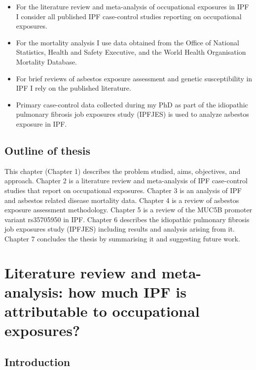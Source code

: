 \documentclass[
]{article}
\providecommand{\tightlist}{%
  \setlength{\itemsep}{0pt}\setlength{\parskip}{0pt}}
\begin{document}
\begin{itemize}
\tightlist
\item
  For the literature review and meta-analysis of occupational exposures
  in IPF I consider all published IPF case-control studies reporting on
  occupational exposures.
\item
  For the mortality analysis I use data obtained from the Office of
  National Statistics, Health and Safety Executive, and the World Health
  Organisation Mortality Database.
\item
  For brief reviews of asbestos exposure assessment and genetic
  susceptibility in IPF I rely on the published literature.
\item
  Primary case-control data collected during my PhD as part of the
  idiopathic pulmonary fibrosis job exposures study (IPFJES) is used to
  analyze asbestos exposure in IPF.
\end{itemize}

\hypertarget{outline-of-thesis}{%
\subsection{Outline of thesis}\label{outline-of-thesis}}

This chapter (Chapter 1) describes the problem studied, aims,
objectives, and approach. Chapter 2 is a literature review and
meta-analysis of IPF case-control studies that report on occupational
exposures. Chapter 3 is an analysis of IPF and asbestos related disease
mortality data. Chapter 4 is a review of asbestos exposure assessment
methodology. Chapter 5 is a review of the MUC5B promoter variant
rs35705950 in IPF. Chapter 6 describes the idiopathic pulmonary fibrosis
job exposures study (IPFJES) including results and analysis arising from
it. Chapter 7 concludes the thesis by summarising it and suggesting
future work.

\hypertarget{literature-review-and-meta-analysis-how-much-ipf-is-attributable-to-occupational-exposures}{%
\section{Literature review and meta-analysis: how much IPF is
attributable to occupational
exposures?}\label{literature-review-and-meta-analysis-how-much-ipf-is-attributable-to-occupational-exposures}}

\hypertarget{introduction}{%
\subsection{Introduction}\label{introduction}}
\end{document}
